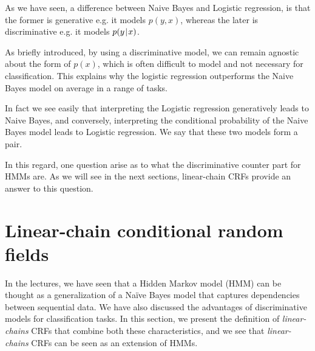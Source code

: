 \documentclass[a4paper, 11pt]{article}
\newcommand{\pcond}[2]{p(#1 \hspace{-.2em}\mid\hspace{-.2em} #2)}
\begin{document}
As we have seen, a difference between Naive Bayes and Logistic
regression, is that the former is generative e.g. it models $p(y, x)$,
whereas the later is discriminative e.g. it models $\pcond{y}{x}$.

As briefly introduced, by using a discriminative model, we can remain
agnostic about the form of $p(x)$, which is often difficult to model
and not necessary for classification. This explains why the logistic
regression outperforms the Naive Bayes model on average in a range of
tasks.

In fact we see easily that interpreting the Logistic regression
generatively leads to Naive Bayes, and conversely, interpreting the
conditional probability of the Naive Bayes model leads to Logistic
regression. We say that these two models form a
 pair.

In this regard, one question arise as to what the discriminative
counter part for HMMs are. As we will see in the next sections,
linear-chain CRFs provide an answer to this question.









\section{Linear-chain conditional random fields}

In the lectures, we have seen that a Hidden Markov model (HMM) can be
thought as a generalization of a Naïve Bayes model that captures
dependencies between sequential data. We have also discussed the
advantages of discriminative models for classification
tasks. In this section, we present the definition of
\emph{linear-chains} CRFs that combine both these characteristics, and we
see that \emph{linear-chains} CRFs can be seen as an extension of HMMs.
\end{document}
